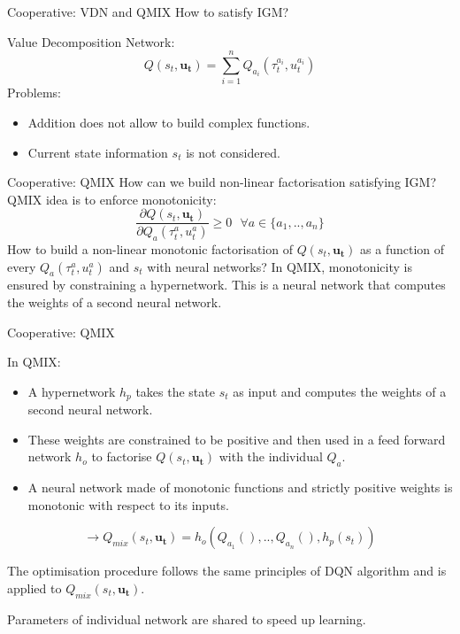 \documentclass{beamer}
\begin{document}
\begin{frame}{Cooperative: VDN and QMIX}
How to satisfy IGM?

Value Decomposition Network:
\begin{equation*}
    Q(s_t, \bm{u_t}) = \sum_{i=1}^n Q_{a_i}(\tau^{a_i}_t, u^{a_i}_t) 
\end{equation*}
Problems:
\begin{itemize}
    \item Addition does not allow to build complex functions.
    \item Current state information $s_t$ is not considered.
\end{itemize}
\end{frame}

\begin{frame}{Cooperative: QMIX}
How can we build non-linear factorisation satisfying IGM? 
\vfill
QMIX idea is to enforce monotonicity:
\begin{equation*}
    \frac{\partial Q(s_t, \bm{u_t})}{\partial Q_{a}(\tau^{a}_t, u_t^{a})} \geq 0 \text{ } \forall a \in \{a_1,..,a_n\}
\end{equation*}
\vfill
How to build a non-linear monotonic factorisation of $Q(s_t, \bm{u_t})$ as a function of every  $Q_a(\tau^{a}_t, u^a_t)$ and $s_t$ with neural networks?
\vfill
In QMIX, monotonicity is ensured by constraining a hypernetwork.
This is a neural network that computes the weights of a second neural network.


\end{frame}



\begin{frame}{Cooperative: QMIX}

In QMIX:
\begin{itemize}
    \item A hypernetwork $h_p$ takes the state $s_t$ as input and computes the weights of a second neural network.
    \item These weights are constrained to be positive and then used in a feed forward network $h_o$ to factorise $Q(s_t, \bm{u_t})$ with the individual $Q_a$.
    \item A neural network made of monotonic functions and strictly positive weights is monotonic with respect to its inputs.
\end{itemize}

$$\rightarrow Q_{mix}(s_t, \bm{u_t}) = h_o\left(Q_{a_1}(),..,Q_{a_n}(), h_p(s_t)\right)$$

The optimisation procedure follows the same principles of DQN algorithm and is applied to $Q_{mix}(s_t, \bm{u_t})$.

Parameters of individual network are shared to speed up learning.
\end{frame}
\end{document}
